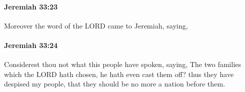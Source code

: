 		\paragraph{Jeremiah 33:23} %
			\label{JEREMIAH-33-23}

			Moreover the word of the LORD came to Jeremiah, saying,


		\paragraph{Jeremiah 33:24} %
			\label{JEREMIAH-33-24}

			Considerest thou not what this people have spoken, saying, The two families which the LORD hath chosen, he hath even cast them off? thus they have despised my people, that they should be no more a nation before them.



